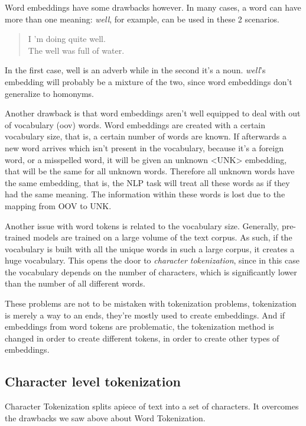 Word embeddings have some drawbacks however. In many cases, a word can have more than one meaning: \emph{well}, for example, can be used in these 2 scenarios.

\begin{quote}
    I 'm doing quite well.\\
    The well was full of water.
\end{quote}

In the first case, well is an adverb while in the second it's a noun. \emph{well}'s embedding will probably be a mixture of the two, since word embeddings don't generalize to homonyms.

Another drawback is that word embeddings aren't well equipped to deal with out of vocabulary (oov) words. Word embeddings are created with a certain vocabulary size, that is, a certain number of words are known. If afterwards a new word arrives which isn't present in the vocabulary, because it's a foreign word, or a misspelled word, it will be given an unknown <UNK> embedding, that will be the same for all unknown words. Therefore all unknown words have the same embedding, that is, the NLP task will treat all these words as if they had the same meaning. The information within these words is lost due to the mapping from OOV to UNK.

Another issue with word tokens is related to the vocabulary size. Generally, pre-trained models are trained on a large volume of the text corpus. As such, if the vocabulary is built with all the unique words in such a large corpus, it creates a huge vocabulary. This opens the door to \emph{character tokenization}, since in this case the vocabulary depends on the number of characters, which is significantly lower than the number of all different words.

These problems are not to be mistaken with tokenization problems, tokenization is merely a way to an ends, they're mostly used to create embeddings. And if embeddings from word tokens are problematic, the tokenization method is changed in order to create different tokens, in order to create other types of embeddings.
    
\subsection{Character level tokenization}

Character Tokenization splits apiece of text into a set of characters. It overcomes the drawbacks we saw above about Word Tokenization.

